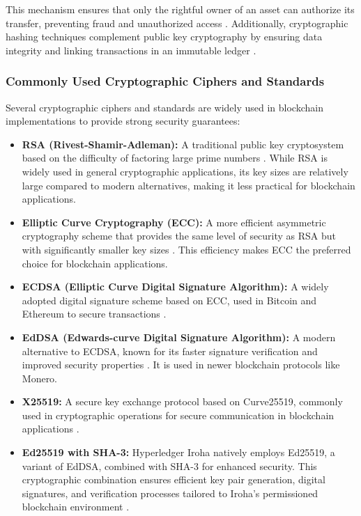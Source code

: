 \documentclass[final]{rc-book-2.14}
\begin{document}
This mechanism ensures that only the rightful owner of an asset can authorize its transfer, preventing fraud and unauthorized access \cite{wood2014ethereum}. Additionally, cryptographic hashing techniques complement public key cryptography by ensuring data integrity and linking transactions in an immutable ledger \cite{merkle1988digital}.

\subsubsection{Commonly Used Cryptographic Ciphers and Standards}
Several cryptographic ciphers and standards are widely used in blockchain implementations to provide strong security guarantees:

\begin{itemize}
    \item \textbf{RSA (Rivest-Shamir-Adleman):} A traditional public key cryptosystem based on the difficulty of factoring large prime numbers \cite{rivest1978method}. While RSA is widely used in general cryptographic applications, its key sizes are relatively large compared to modern alternatives, making it less practical for blockchain applications.
    \item \textbf{Elliptic Curve Cryptography (ECC):} A more efficient asymmetric cryptography scheme that provides the same level of security as RSA but with significantly smaller key sizes \cite{miller1986use}. This efficiency makes ECC the preferred choice for blockchain applications.
    \item \textbf{ECDSA (Elliptic Curve Digital Signature Algorithm):} A widely adopted digital signature scheme based on ECC, used in Bitcoin and Ethereum to secure transactions \cite{johnson2001elliptic}.
    \item \textbf{EdDSA (Edwards-curve Digital Signature Algorithm):} A modern alternative to ECDSA, known for its faster signature verification and improved security properties \cite{bernstein2012high}. It is used in newer blockchain protocols like Monero.
    \item \textbf{X25519:} A secure key exchange protocol based on Curve25519, commonly used in cryptographic operations for secure communication in blockchain applications \cite{langley2016curve25519}.
    \item \textbf{Ed25519 with SHA-3:} Hyperledger Iroha natively employs Ed25519, a variant of EdDSA, combined with SHA-3 for enhanced security. This cryptographic combination ensures efficient key pair generation, digital signatures, and verification processes tailored to Iroha’s permissioned blockchain environment \cite{hyperledger_iroha}.
\end{itemize}
\end{document}
